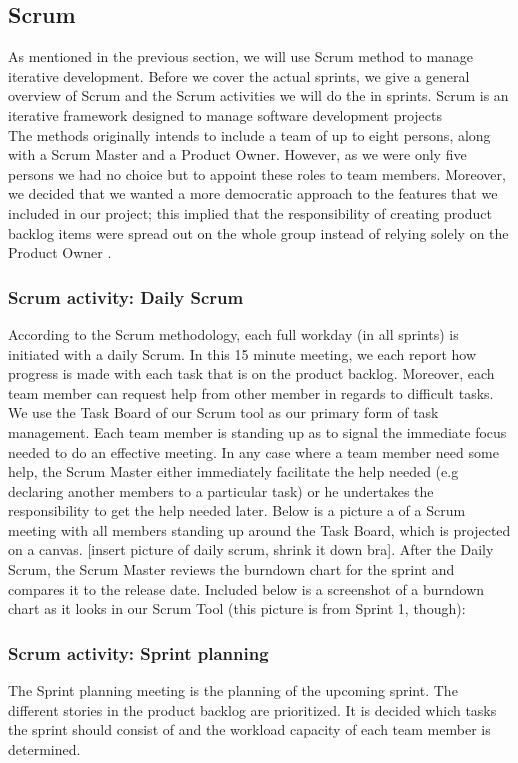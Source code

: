 \subsection{Scrum}
As mentioned in the previous section, we will use Scrum method to manage iterative development. Before we cover the actual sprints, we give a general overview of Scrum and the Scrum activities we will do the in sprints.
\newline
Scrum is an iterative framework designed to manage software development projects \cite{scrumguide} \\
The methods originally intends to include a team of up to eight persons, along with a Scrum Master and a Product Owner. However, as we were only five persons we had no choice but to appoint these roles to team members. Moreover, we decided that we wanted a more democratic approach to the features that we included in our project; this implied that the responsibility of creating product backlog items were spread out on the whole group instead of relying solely on the Product Owner \cite[p.~12]{scrumguide}.
\subsubsection{Scrum activity: Daily Scrum}
According to the Scrum methodology, each full workday (in all sprints) is initiated with a daily Scrum. In this 15 minute meeting, we each report how progress is made with each task that is on the product backlog. Moreover, each team member can request help from other member in regards to difficult tasks. We use the Task Board of our Scrum tool as our primary form of task management. Each team member is standing up as to signal the immediate focus needed to do an effective meeting. In any case where a team member need some help, the Scrum Master either immediately facilitate the help needed (e.g declaring another members to a particular task) or he undertakes the responsibility to get the help needed later. Below is a picture a of a Scrum meeting with all members standing up around the Task Board, which is projected on a canvas.
[insert picture of daily scrum, shrink it down bra]. 
After the Daily Scrum, the Scrum Master reviews the burndown chart for the sprint and compares it to the release date. Included below is a screenshot of a burndown chart as it looks in our Scrum Tool (this picture is from Sprint 1, though):

\subsubsection{Scrum activity: Sprint planning}
The Sprint planning meeting is the planning of the upcoming sprint. The different stories in the product backlog are prioritized. It is decided which tasks the sprint should consist of and the workload capacity of each team member is determined.

